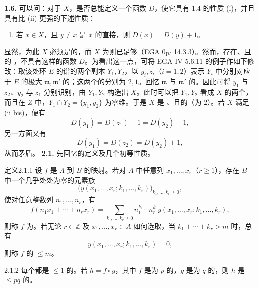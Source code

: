 \textbf{1.6.} 可以问：对于   $X$，是否总能定义一个函数 $D$，使它具有 1.4 的性质 (i)，并且具有比 (ii) 更强的下述性质：
\begin{enumerate}
\item[(ii bis)] 若 $x\in X$，且 $y\ne x$ 是 $x$ 的直接，则 $D(x)=D(y)+1$。
\end{enumerate}
显然，为此 $X$ 必须是的，而 $X$ 为则已足够（EGA $0_{\mathrm{IV}}$ 14.3.3）。然而，存在、且的  ，不具有这样的函数 $D$。为看出这一点，可将 EGA IV 5.6.11 的例子作如下修改：取该处环 $E$ 的谱的两个副本 $Y_1,Y_2$，以 $y_i,z_i$（$i=1,2$）表示 $Y_i$ 中分别对应于 $E$ 的极大 $\mathfrak m,\mathfrak m'$ 的；这两个的分别为 $2,1$。回忆 $\mathfrak m$ 与 $\mathfrak m'$ 的。因此可将 $y_1$ 与 $z_2$、$y_2$ 与 $z_1$ 分别识别，由 $Y_1,Y_2$ 构造出 $X$。此时可以把 $Y_1,Y_2$ 看成 $X$ 的两个，而且在 $Z$ 中，$Y_1\cap Y_2=\{y_1,y_2\}$ 为零维。于是 $X$ 是 、且的（为 $2$）。若 $X$ 满足 (ii bis)，便有
\[D(y_1)=D(z_1)-1=D(y_2)-1,\]
另一方面又有
\[D(y_1)=D(z_2)=D(y_2)+1,\]
从而矛盾。
\textbf{2.1.} 先回忆的定义及几个初等性质。
\begin{SGAresult}{定义}{2.1.1}
设 $f$ 是 $A$ 到 $B$ 的映射。若对 $A$ 中任意列 $x_1,\ldots,x_r$（$r\geq1$），存在 $B$ 中一个几乎处处为零的元素族
\[\bigl(y(x_1,\ldots,x_r;k_1,\ldots,k_r)\bigr)_{k_1,\ldots,k_r\geq0},\]
使对任意整数列 $n_1,\ldots,n_r$，有
\[f(n_1x_1+\cdots+n_rx_r)=\sum_{k_1,\ldots,k_r\geq0}n_1^{k_1}\cdots n_r^{k_r}y(x_1,\ldots,x_r;k_1,\ldots,k_r),\]
则称 $f$ 为。若无论 $r\in\mathbb Z$ 及 $x_1,\ldots,x_r\in A$ 如何选取，当 $k_1+\cdots+k_r>m$ 时，总有
\[y(x_1,\ldots,x_r;k_1,\ldots,k_r)=0,\]
则称 $f$ 的 $\leq m$。
\end{SGAresult}
\begin{SGAresult}{}{2.1.2}
每个都是 $\leq1$ 的。若 $h=f\circ g$，其中 $f$ 是为 $p$ 的，$g$ 是为 $q$ 的，则 $h$ 是 $\leq pq$ 的。
\end{SGAresult}
